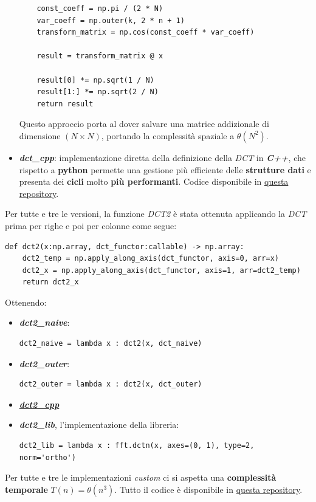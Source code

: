 \begin{itemize}
\begin{lstlisting}
    const_coeff = np.pi / (2 * N)                             
    var_coeff = np.outer(k, 2 * n + 1)                     
    transform_matrix = np.cos(const_coeff * var_coeff)       

    result = transform_matrix @ x                            

    result[0] *= np.sqrt(1 / N)
    result[1:] *= np.sqrt(2 / N)
    return result
        \end{lstlisting}
    Questo approccio porta al dover salvare una matrice addizionale di dimensione $(N \times N)$, portando la complessità spaziale a $\theta(N^2)$.
        
        \item \textit{\textbf{dct\_cpp}}: implementazione diretta della definizione della \textit{DCT} in \textbf{\textit{C++}}, che rispetto a \textbf{python} permette una gestione più efficiente delle \textbf{strutture dati} e presenta dei \textbf{cicli} molto \textbf{più performanti}. Codice disponibile in \href{https://github.com/iFoxz17/Jpug/tree/main/dct2}{questa repository}.
    \end{itemize}
    Per tutte e tre le versioni, la funzione \textit{DCT2} è stata ottenuta applicando la \textit{DCT} prima per righe e poi per colonne come segue:

    \begin{lstlisting}
def dct2(x:np.array, dct_functor:callable) -> np.array:
    dct2_temp = np.apply_along_axis(dct_functor, axis=0, arr=x)
    dct2_x = np.apply_along_axis(dct_functor, axis=1, arr=dct2_temp)
    return dct2_x
        \end{lstlisting}
    Ottenendo:
    \begin{itemize}
        \item \textbf{\textit{dct2\_naive}}: 
            \begin{lstlisting}
dct2_naive = lambda x : dct2(x, dct_naive)
            \end{lstlisting}

        \item \textbf{\textit{dct2\_outer}}:
            \begin{lstlisting}
dct2_outer = lambda x : dct2(x, dct_outer)
            \end{lstlisting}

        \item \textbf{\textit{\href{https://github.com/iFoxz17/Jpug/blob/main/dct2/dct.cpp}{dct2\_cpp}}}

        \item \textbf{\textit{dct2\_lib}}, l'implementazione della libreria:
            \begin{lstlisting}
dct2_lib = lambda x : fft.dctn(x, axes=(0, 1), type=2, norm='ortho')
        \end{lstlisting}
    \end{itemize}
    Per tutte e tre le implementazioni \textit{custom} ci si aspetta una \textbf{complessità temporale} $T(n) = \theta(n^3)$.
    Tutto il codice è disponibile in \href{https://github.com/iFoxz17/Jpug/tree/main/dct2}{questa repository}.
    
